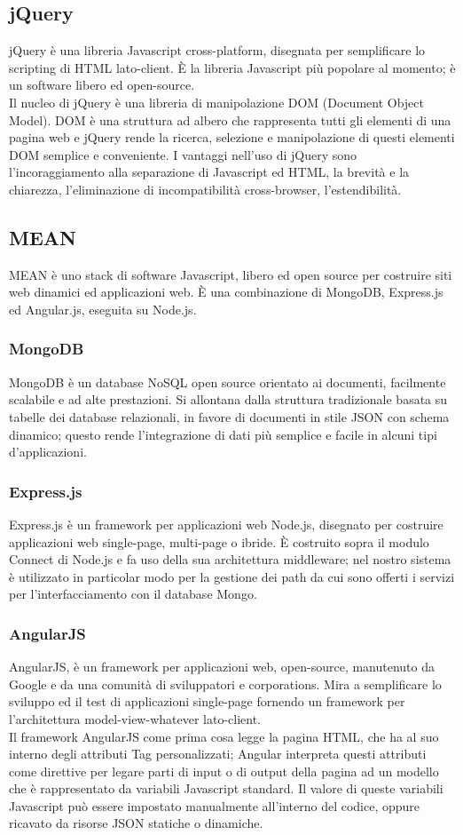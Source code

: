 	\subsection{jQuery}{
		jQuery è una libreria Javascript cross-platform, disegnata per semplificare lo scripting di HTML lato-client. È la libreria Javascript più popolare al momento; è un software libero ed open-source. \\
		Il nucleo di jQuery è una libreria di manipolazione DOM (Document Object Model). DOM è una struttura ad albero che rappresenta tutti gli elementi di una pagina web e jQuery rende la ricerca, selezione e manipolazione di questi elementi DOM semplice e conveniente.
		I vantaggi nell'uso di jQuery sono l'incoraggiamento alla separazione di Javascript ed HTML, la brevità e la chiarezza, l'eliminazione di incompatibilità cross-browser, l'estendibilità.
	}
	\subsection{MEAN}{
		MEAN è uno stack di software Javascript, libero ed open source per costruire siti web dinamici ed applicazioni web. È una combinazione di MongoDB, Express.js ed Angular.js, eseguita su Node.js.
	}
	\subsubsection{MongoDB}{
		MongoDB è un database NoSQL open source orientato ai documenti, facilmente scalabile e ad alte prestazioni. Si allontana dalla struttura tradizionale basata su tabelle dei database relazionali, in favore di documenti in stile JSON con schema dinamico; questo rende l'integrazione di dati più semplice e facile in alcuni tipi d'applicazioni.
	}
	\subsubsection{Express.js}{
		Express.js è un framework per applicazioni web Node.js, disegnato per costruire applicazioni web single-page, multi-page o ibride.
		È costruito sopra il modulo Connect di Node.js e fa uso della sua architettura middleware; nel nostro sistema è utilizzato in particolar modo per la gestione dei path da cui sono  offerti i servizi per l'interfacciamento con il database Mongo.
	}
	\subsubsection{AngularJS}{
		AngularJS, è un framework per applicazioni web, open-source, manutenuto da Google e da una comunità di sviluppatori e corporations. Mira a semplificare lo sviluppo ed il test di applicazioni single-page fornendo un framework per l'architettura model-view-whatever lato-client. \\
		Il framework AngularJS come prima cosa legge la pagina HTML, che ha al suo interno degli attributi Tag personalizzati; Angular interpreta questi attributi come direttive per legare parti di input o di output della pagina ad un modello che è rappresentato da variabili Javascript standard. Il valore di queste variabili Javascript può essere impostato manualmente all'interno del codice, oppure ricavato da risorse JSON statiche o dinamiche.
	}

